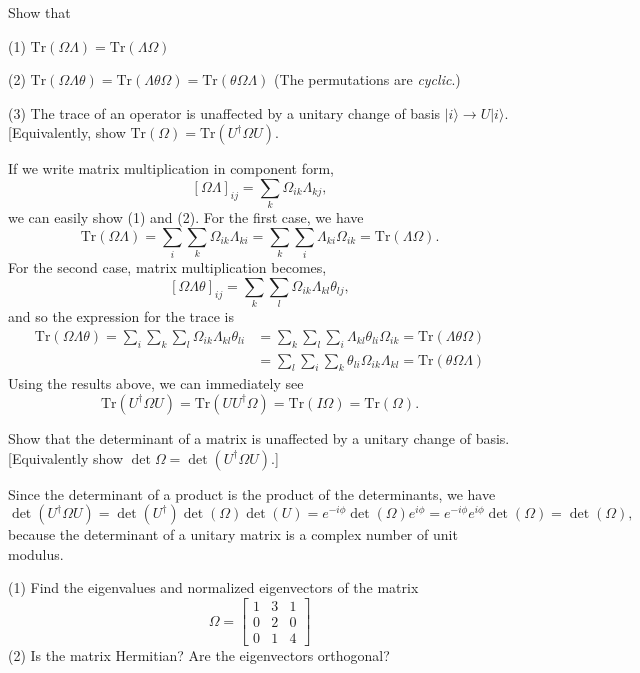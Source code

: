 \documentclass[../principles-of-quantum-mechanics.tex]{subfiles}
\begin{document}
\begin{questions}
\question Show that

(1) $\mathrm{Tr}(\Omega\Lambda) = \mathrm{Tr}(\Lambda\Omega)$

(2) $\mathrm{Tr}(\Omega\Lambda\theta) = \mathrm{Tr}(\Lambda\theta\Omega) = \mathrm{Tr}(\theta\Omega\Lambda)$ (The permutations are \textit{cyclic}.)

(3) The trace of an operator is unaffected by a unitary change of basis $|i\rangle \to U|i\rangle$. [Equivalently, show $\mathrm{Tr}(\Omega) = \mathrm{Tr}(U^\dagger\Omega{U})$.

\begin{solution}
	If we write matrix multiplication in component form,
	\[
		[\Omega\Lambda]_{ij} = \sum_{k}\Omega_{ik}\Lambda_{kj},
	\]
	we can easily show (1) and (2). For the first case, we have
	\[
		\mathrm{Tr}(\Omega\Lambda) = \sum_{i}\sum_{k}\Omega_{ik}\Lambda_{ki} = \sum_{k}\sum_{i}\Lambda_{ki}\Omega_{ik} = \mathrm{Tr}(\Lambda\Omega).
	\]
	For the second case, matrix multiplication becomes,
	\[
		[\Omega\Lambda\theta]_{ij} = \sum_k\sum_l\Omega_{ik}\Lambda_{kl}\theta_{lj},
	\]
	and so the expression for the trace is
	\begin{align*}
		\mathrm{Tr}(\Omega\Lambda\theta) = \sum_i\sum_k\sum_l\Omega_{ik}\Lambda_{kl}\theta_{li}
		&= \sum_k\sum_l\sum_i\Lambda_{kl}\theta_{li}\Omega_{ik} = \mathrm{Tr}(\Lambda\theta\Omega) \\
		&= \sum_l\sum_i\sum_k\theta_{li}\Omega_{ik}\Lambda_{kl} = \mathrm{Tr}(\theta\Omega\Lambda)
	\end{align*}
	Using the results above, we can immediately see
	\[
		\mathrm{Tr}(U^\dagger\Omega{U}) = \mathrm{Tr}(UU^\dagger\Omega) = \mathrm{Tr}(I\Omega) = \mathrm{Tr}(\Omega).
	\]
\end{solution}

\question Show that the determinant of a matrix is unaffected by a unitary change of basis. [Equivalently show $\det\Omega = \det(U^\dagger\Omega{U})$.]

\begin{solution}
	Since the determinant of a product is the product of the determinants, we have
	\[
		\det(U^\dagger\Omega{U}) = \det({U^\dagger})\det(\Omega)\det({U}) = e^{-i\phi}\det(\Omega){e^{i\phi}} = e^{-i\phi}e^{i\phi}\det(\Omega) = \det(\Omega),
	\]
	because the determinant of a unitary matrix is a complex number of unit modulus.
\end{solution}

\question (1) Find the eigenvalues and normalized eigenvectors of the matrix
\[
	\Omega = \begin{bmatrix}1 & 3 & 1 \\ 0 & 2 & 0 \\ 0 & 1 & 4\end{bmatrix}
\]
(2) Is the matrix Hermitian? Are the eigenvectors orthogonal?


\end{questions}
\end{document}
